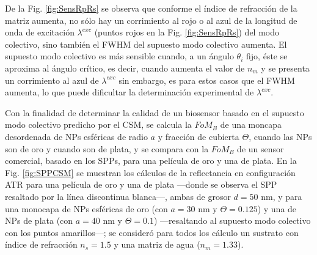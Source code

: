 De la Fig. \ref{fig:SensRpRs} se observa que conforme el índice de refracción de la matriz aumenta, no sólo hay un corrimiento al rojo o al azul de la longitud de onda de excitación $\lambda^{exc}$  (puntos rojos en la Fig. \ref{fig:SensRpRs}) del modo colectivo,  sino también  el FWHM del supuesto modo colectivo aumenta. El supuesto modo colectivo es más sensible cuando, a un ángulo  $\theta_i$ fijo, éste se aproxima al ángulo crítico, es decir, cuando aumenta el valor de $n_m$ y se presenta un corrimiento al azul de $\lambda^{exc}$  sin embargo, es para estos casos que el FWHM aumenta, lo que puede dificultar la determinación experimental de $\lambda^{exc}$. 

Con la finalidad de determinar la calidad de un biosensor basado en el supuesto modo colectivo predicho por el CSM, se calcula la $\textit{FoM}_B$ de una moncapa desordenada de NPs esféricas de radio $a$ y fracción de cubierta $\Theta$, cuando las NPs son de oro y cuando son de plata, y se compara con la $\textit{FoM}_B$ de un sensor comercial, basado en los SPPs, para una película de oro y una de plata. En la Fig. \ref{fig:SPPCSM} se muestran los cálculos de la reflectancia en configuración ATR para una película de oro y una de plata ---donde se observa el SPP resaltado por la línea discontinua blanca---, ambas de grosor $d=50$ nm, y para una monocapa de NPs esféricas de oro (con $a=30$ nm y $\Theta=0.125$) y una de NPs de plata (con $a=40$ nm y $\Theta=0.1$) ---resaltando al supuesto modo colectivo con los puntos amarillos---; se consideró para todos los cálculo un sustrato con índice de refracción $n_s=1.5$ y una matriz de agua ($n_m=1.33$).




